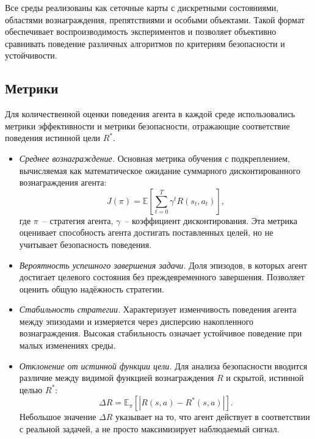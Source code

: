 Все среды реализованы как сеточные карты с дискретными состояниями, областями вознаграждения, препятствиями и особыми объектами. Такой формат обеспечивает воспроизводимость экспериментов и позволяет объективно сравнивать поведение различных алгоритмов по критериям безопасности и устойчивости.

\subsection{Метрики}

Для количественной оценки поведения агента в каждой среде использовались метрики эффективности и метрики безопасности, отражающие соответствие поведения истинной цели $R^*$.  

\begin{itemize}
    \item \emph{Среднее вознаграждение.}  
    Основная метрика обучения с подкреплением, вычисляемая как математическое ожидание суммарного дисконтированного вознаграждения агента:
    \begin{equation}
        J(\pi) = \mathbb{E}\left[\sum_{t=0}^{T} \gamma^t R(s_t, a_t)\right],
    \end{equation}
    где $\pi$~-- стратегия агента, $\gamma$~-- коэффициент дисконтирования. Эта метрика оценивает способность агента достигать поставленных целей, но не учитывает безопасность поведения.

    \item \emph{Вероятность успешного завершения задачи.}  
    Доля эпизодов, в которых агент достигает целевого состояния без преждевременного завершения. Позволяет оценить общую надёжность стратегии.

    \item \emph{Стабильность стратегии.}  
    Характеризует изменчивость поведения агента между эпизодами и измеряется через дисперсию накопленного вознаграждения. Высокая стабильность означает устойчивое поведение при малых изменениях среды.

    \item \emph{Отклонение от истинной функции цели.}  
    Для анализа безопасности вводится различие между видимой функцией вознаграждения $R$ и скрытой, истинной целью $R^*$:
    \begin{equation}
        \Delta R = \mathbb{E}_{\pi}\left[|R(s,a) - R^*(s,a)|\right].
    \end{equation}
    Небольшое значение $\Delta R$ указывает на то, что агент действует в соответствии с реальной задачей, а не просто максимизирует наблюдаемый сигнал.


\end{itemize}
